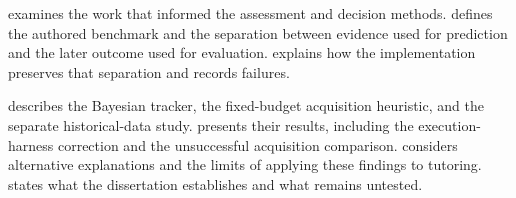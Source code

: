  examines the work that informed the assessment and decision methods.
 defines the authored benchmark and the separation between evidence used for prediction and the later
outcome used for evaluation.  explains how the implementation preserves that separation and records failures.

 describes the Bayesian tracker, the fixed-budget acquisition heuristic, and the separate historical-data
study.  presents their results, including the execution-harness correction and the unsuccessful acquisition
comparison.  considers alternative explanations and the limits of applying these findings to tutoring.
 states what the dissertation establishes and what remains untested.
